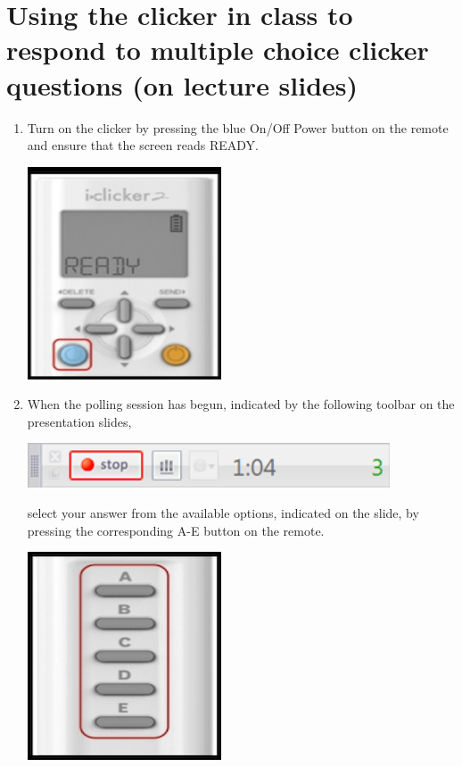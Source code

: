 \documentclass[12pt]{article}
\begin{document}
\section{Using the clicker in class to respond to multiple choice clicker questions (on lecture slides)}
\begin{enumerate}

\item Turn on the clicker by pressing the blue On/Off Power button on the remote and ensure that the screen reads READY.

\begin{center}
\includegraphics{clicker_images/clicker_ready.png}
\end{center}

\item When the polling session has begun, indicated by the following toolbar on the presentation slides,

\begin{center}
\includegraphics{clicker_images/polling.png}
\end{center}

select your answer from the available options, indicated on the slide, by pressing the corresponding A-E button on the remote.

\begin{center}
\includegraphics{clicker_images/buttons.png}
\end{center}


\end{enumerate}
\end{document}
